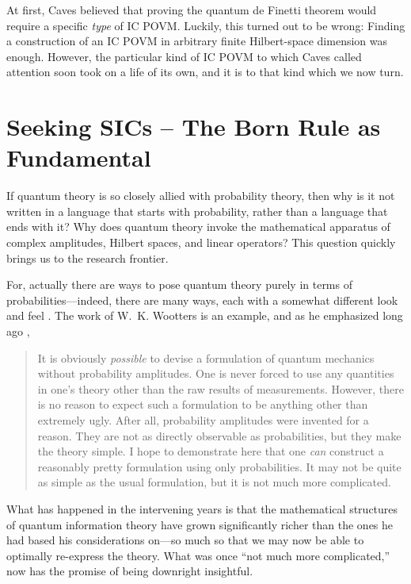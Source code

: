 \documentclass[aps,pra,superscriptaddress,10pt,tightenlines,twocolumn,nofootinbib]{revtex4}
\begin{document}
At first, Caves believed that proving the quantum de Finetti theorem would require a specific {\it type\/} of IC POVM.  Luckily, this turned out to be wrong:  Finding a construction of an IC POVM in arbitrary finite Hilbert-space dimension was enough.  However, the particular kind of IC POVM to which Caves called attention soon took on a life of its own, and it is to that kind which we now turn.

\section{Seeking SICs -- The Born Rule as Fundamental}

\label{SeekingSICs}

If quantum theory is so closely allied with probability theory, then why is it not written in a language that starts with probability, rather than a language that ends with it?  Why does quantum theory invoke the mathematical apparatus of complex amplitudes, Hilbert spaces, and linear operators?  This question quickly brings us to the research frontier.

For, actually there are ways to pose quantum theory purely in terms of probabilities---indeed, there are many ways, each with a somewhat different look and feel \cite{Ferrie09}.  The work of W.~K. Wootters is an example, and as he emphasized long ago \cite{Wootters86},
\begin{quote}
\noindent It is obviously {\it possible\/} to devise a formulation of quantum mechanics
without probability amplitudes. One is never forced to use any quantities in
one's theory other than the raw results of measurements. However, there is
no reason to expect such a formulation to be anything other than
extremely ugly. After all, probability amplitudes were invented for a reason.
They are not as directly observable as probabilities, but they make the
theory simple. I hope to demonstrate here that one {\it can\/} construct a
reasonably pretty formulation using only probabilities. It may not be quite
as simple as the usual formulation, but it is not much more complicated.
\end{quote}
What has happened in the intervening years is that the mathematical structures of quantum information theory have grown significantly richer than the ones he had based his considerations on---so much so that we may now be able to optimally re-express the theory.  What was once ``not much more complicated,'' now has the promise of being downright insightful.
\end{document}
